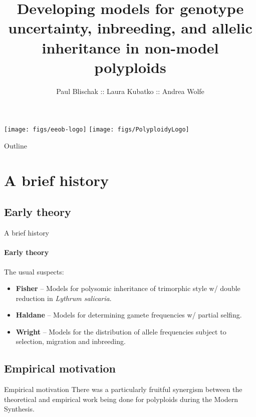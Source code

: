 \documentclass[presentation,serif]{beamer}
\title[Genotype calls with inbreeding]{Developing models for genotype uncertainty, inbreeding, and allelic inheritance in non-model polyploids}
\author[Blischak \textit{et al}.]{Paul Blischak :: Laura Kubatko :: Andrea Wolfe}
\date{}
\begin{document}
\begin{frame}[plain]
	\titlepage
	\vspace{-0.9in}
	\begin{center}
		\texttt{[image: figs/eeob-logo]} \hfill \texttt{[image: figs/PolyploidyLogo]}
	\end{center}
\end{frame}

\begin{frame}[t]{Outline}
	\tableofcontents
\end{frame}

\section{A brief history}

\subsection{Early theory}

\begin{frame}[t]{A brief history}
	\framesubtitle{Early theory}
	The usual suspects:
	\begin{itemize}
		\item \textbf{Fisher} -- Models for polysomic inheritance of trimorphic style w/ double reduction in \textit{Lythrum salicaria}.
		\item \textbf{Haldane} -- Models for determining gamete frequencies w/ partial selfing.
		\item \textbf{Wright} -- Models for the distribution of allele frequencies subject to selection, migration and inbreeding.
	\end{itemize}

	\begin{center}
	\end{center}

\end{frame}

\subsection{Empirical motivation}

\begin{frame}[t]{Empirical motivation}
	There was a particularly fruitful synergism between the theoretical and empirical work being done for polyploids during the Modern Synthesis.
	\vspace{0.1in}

	\begin{center}
	\end{center}
\end{frame}
\end{document}
